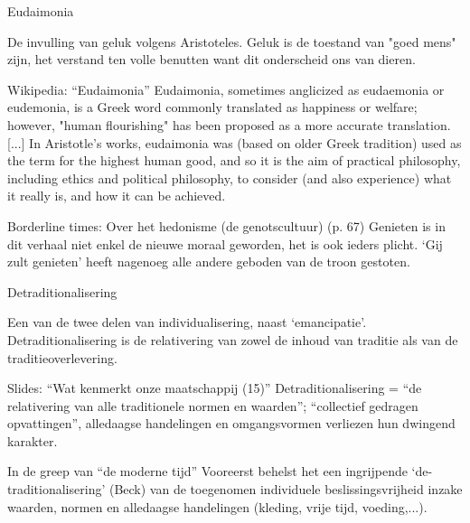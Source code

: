 \documentclass[main.tex]{subfiles}
\begin{document}
\begin{examenvraag}
    \begin{vraag}
        Eudaimonia
    \end{vraag}

    \begin{antwoord}
        De invulling van geluk volgens Aristoteles.‭ ‬Geluk is de toestand van‭ "‬goed mens‭" ‬zijn,‭ ‬het verstand ten volle benutten want dit onderscheid ons van dieren.
        \begin{citaat}{Wikipedia: ``Eudaimonia''}
            Eudaimonia, sometimes anglicized as eudaemonia or eudemonia, is a Greek word commonly translated as happiness or welfare; however, "human flourishing" has been proposed as a more accurate translation.
            [...]
            In Aristotle's works, eudaimonia was (based on older Greek tradition) used as the term for the highest human good, and so it is the aim of practical philosophy, including ethics and political philosophy, to consider (and also experience) what it really is, and how it can be achieved.
        \end{citaat}
        \begin{citaat}{Borderline times: Over het hedonisme (de genotscultuur) (p. 67)}
            Genieten is in dit verhaal niet enkel de nieuwe moraal geworden, het is ook ieders plicht.
            `Gij zult genieten' heeft nagenoeg alle andere geboden van de troon gestoten.
        \end{citaat}
    \end{antwoord}
\end{examenvraag}


\begin{examenvraag}
    \begin{vraag}
        Detraditionalisering
    \end{vraag}

    \begin{antwoord}
        Een van de twee delen van individualisering, naast `emancipatie'.
        Detraditionalisering is de relativering van zowel de inhoud van traditie als van de traditieoverlevering.

        \begin{citaat}{Slides: ``Wat kenmerkt onze maatschappij (15)''}
            Detraditionalisering = “de relativering van alle traditionele normen en waarden”; “collectief gedragen opvattingen”, alledaagse handelingen en omgangsvormen verliezen hun dwingend karakter.
        \end{citaat}
        \begin{citaat}{In de greep van ``de moderne tijd''}
            Vooreerst behelst het een ingrijpende `de-traditionalisering' (Beck) van de toegenomen individuele beslissingsvrijheid inzake waarden, normen en alledaagse handelingen (kleding, vrije tijd, voeding,...).
        \end{citaat}
    \end{antwoord}
\end{examenvraag}
\end{document}
